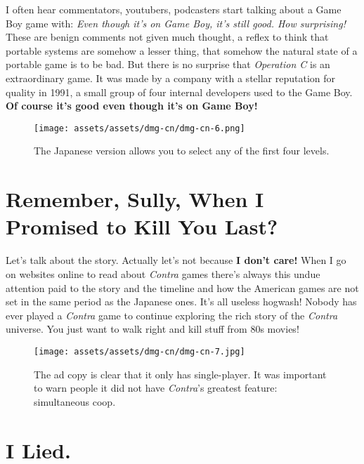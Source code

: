 \documentclass{book}
\begin{document}
I often hear commentators, youtubers, podcasters start talking about a Game Boy game with: \emph{Even though it’s on Game Boy, it’s still good. How surprising!} These are benign comments not given much thought, a reflex to think that portable systems are somehow a lesser thing, that somehow the natural state of a portable game is to be bad. But there is no surprise that \emph{Operation C} is an extraordinary game. It was made by a company with a stellar reputation for quality in 1991, a small group of four internal developers used to the Game Boy. \textbf{Of course it’s good even though it’s on Game Boy!}

\begin{figure}[hbt]
\vskip 10pt
\centering \texttt{[image: assets/assets/dmg-cn/dmg-cn-6.png]}\par\pagetwodescription The Japanese version allows you to select any of the first four levels.
\vskip 6pt
\end{figure}

\FloatBarrier\needspace{5pt}\section*{Remember, Sully, When I Promised to Kill You Last?}\nopagebreak[4]

Let’s talk about the story. Actually let’s not because \textbf{I don’t care!} When I go on websites online to read about \emph{Contra} games there’s always this undue attention paid to the story and the timeline and how the American games are not set in the same period as the Japanese ones. It’s all useless hogwash! Nobody has ever played a \emph{Contra} game to continue exploring the rich story of the \emph{Contra} universe. You just want to walk right and kill stuff from 80s movies!

\begin{figure}[hbt]
\vskip 10pt
\centering \texttt{[image: assets/assets/dmg-cn/dmg-cn-7.jpg]}\par\pagetwodescription The ad copy is clear that it only has single-player. It was important to warn people it did not have \emph{Contra}’s greatest feature: simultaneous coop.
\vskip 6pt
\end{figure}

\FloatBarrier\needspace{5pt}\section*{I Lied.}\nopagebreak[4]
\end{document}
